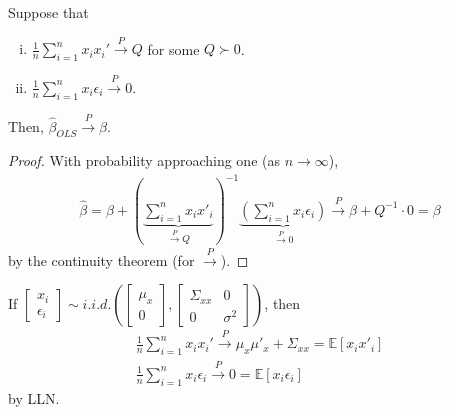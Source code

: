 \documentclass[11pt]{elegantbook}
\begin{document}
\begin{lemma}[Consistency]
    Suppose that
    \begin{enumerate}[(i).]
        \item $\frac{1}{n}\sum_{i=1}^n x_ix_i' \stackrel{P}{\longrightarrow} Q$ for some $Q\succ 0$.
        \item $\frac{1}{n}\sum_{i=1}^n x_i\epsilon_i \stackrel{P}{\longrightarrow} 0$.
    \end{enumerate}
    Then, $\hat{\beta}_{OLS} \stackrel{P}{\longrightarrow} \beta$.
\end{lemma}
\begin{proof}
    With probability approaching one (as $n\to\infty$),
    \begin{equation}
        \begin{aligned}
            \hat{\beta}=\beta+\left(\underbrace{\sum_{i=1}^n x_ix'_i}_{\stackrel{P}{\longrightarrow} Q}\right)^{-1}\underbrace{\left(\sum_{i=1}^n x_i\epsilon_i\right)}_{\stackrel{P}{\longrightarrow} 0}\stackrel{P}{\longrightarrow} \beta + Q^{-1}\cdot 0=\beta
        \end{aligned}
        \nonumber
    \end{equation}
    by the continuity theorem (for $\stackrel{P}{\longrightarrow}$).
\end{proof}
\begin{remark}
    If $\begin{bmatrix}
        x_i\\
        \epsilon_i
    \end{bmatrix}\sim i.i.d. \left(\begin{bmatrix}
        \mu_x\\
        0
    \end{bmatrix},\begin{bmatrix}
        \Sigma_{xx}&	0\\
        0 & \sigma^2
    \end{bmatrix}\right)$, then
    \begin{equation}
        \begin{aligned}
            \frac{1}{n}\sum_{i=1}^n x_ix_i' \stackrel{P}{\longrightarrow} \mu_x\mu'_x+\Sigma_{xx}=\mathbb{E}[x_ix'_i]\\
            \frac{1}{n}\sum_{i=1}^n x_i\epsilon_i \stackrel{P}{\longrightarrow} 0=\mathbb{E}[x_i\epsilon_i]
        \end{aligned}
        \nonumber
    \end{equation}
    by LLN.
\end{remark}
\end{document}
